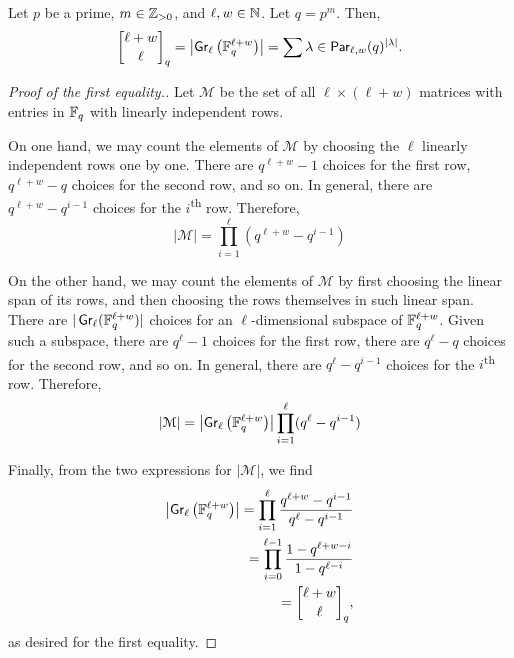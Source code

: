 \begin{lemma} \label{lem:grassmanian_qbinomial_prime_power}
    Let \(p\) be a prime, \(m \in \mathbb{Z}_{> 0}\), and \(\ell, w \in \mathbb{N}\).
    Let \(q = p^m\).
    Then,
    \begin{equation}
        \qbinom{\ell + w}{\ell}
        = \left|
            \Grassmanian_\ell\left(\finitefield{q}^{\ell + w} \right)
        \right|
        = \sum{\lambda \in \Par_{\ell, w}} (q)^{|\lambda|}.
    \end{equation}
\end{lemma}

\begin{proof}[Proof of the first equality.]
    Let \(\mathcal{M}\) be the set of all \(\ell \times (\ell + w)\) matrices with entries in \(\mathbb{F}_{q}\) with linearly independent rows.

    On one hand, we may count the elements of \(\mathcal{M}\) by choosing the \(\ell\) linearly independent rows one by one.
    There are \(q^{\ell + w} - 1\) choices for the first row,
    \(q^{\ell + w} - q\) choices for the second row, and so on.
    In general, there are \(q^{\ell + w} - q^{i-1}\) choices for the \(i\)\textsuperscript{th} row.
    Therefore,
    \begin{equation*}
        \left|
            \mathcal{M}
        \right|
        = \prod_{i=1}^{\ell} (q^{\ell + w} - q^{i-1})
    \end{equation*}

    On the other hand, we may count the elements of \(\mathcal{M}\) by first choosing the linear span of its rows, and then choosing the rows themselves in such linear span.
    There are \(|\operatorname{\mathsf{Gr}}_\ell(\mathbb{F}_{q}^{\ell + w})|\) choices for an \(\ell\)-dimensional subspace of \(\mathbb{F}_{q}^{\ell + w}\).
    Given such a subspace,
    there are \(q^{\ell} - 1\) choices for the first row,
    there are \(q^{\ell} - q\) choices for the second row, and so on.
    In general, there are \(q^{\ell} - q^{i-1}\) choices for the \(i\)\textsuperscript{th} row.
    Therefore,
    \begin{equation*}
        \left|
            \mathcal{M}
        \right|
        = \left|
            \operatorname{\mathsf{Gr}}_\ell\left(\mathbb{F}_{q}^{\ell + w} \right)
        \right|
        \prod_{i=1}^{\ell} (q^{\ell} - q^{i-1})
    \end{equation*}

    Finally, from the two expressions for \(\left| \mathcal{M} \right|\), we find
    \begin{align*}
        \left|
            \Grassmanian_\ell\left(\finitefield{q}^{\ell + w} \right)
        \right|
        = \prod_{i=1}^{\ell} \frac{q^{\ell + w} - q^{i-1}}{q^{\ell} - q^{i-1}} \\
        = \prod_{i=0}^{\ell - 1} \frac{1 - q^{\ell + w - i}}{1 - q^{\ell - i}} \\
        = \qbinom{\ell + w}{\ell},
    \end{align*}
    as desired for the first equality.
\end{proof}

